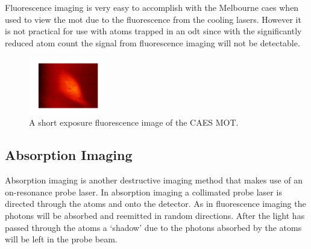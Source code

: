 Fluorescence imaging is very easy to accomplish with the Melbourne \gls{caes} when used to view the \gls{mot} due to the fluorescence from the cooling lasers. However it is not practical for use with atoms trapped in an \gls{odt} since with the significantly reduced atom count the signal from fluorescence imaging will not be detectable.

\begin{figure}[h]
\centering
\includegraphics[width=0.3\textwidth]{figs/fluorescence.pdf}
\caption{A short exposure fluorescence image of the CAES MOT.}
\end{figure}
\subsection{Absorption Imaging}

Absorption imaging is another destructive imaging method that makes use of an on-resonance probe laser. In absorption imaging a collimated probe laser is directed through the atoms and onto the detector. As in fluorescence imaging the photons will be absorbed and reemitted in random directions. After the light has passed through the atoms a `shadow' due to the photons absorbed by the atoms will be left in the probe beam.

